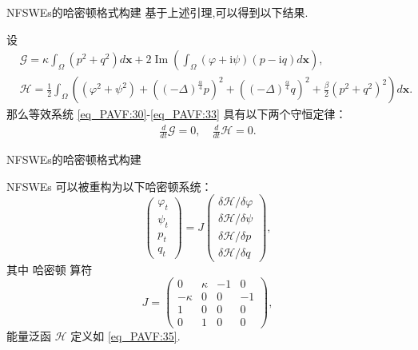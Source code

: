 \documentclass[aspectratio=169]{beamer}
\numberwithin{theorem}{section} %
\begin{document}
\begin{frame}{NFSWEs的哈密顿格式构建}
	基于上述引理,可以得到以下结果.

	\begin{theorem}	\label{thm_PAVF:2_1}
	设
	\begin{align}
	&\mathcal{G}=\kappa\int_{\Omega}(p^2+q^2) d \boldsymbol{x}+2\operatorname{Im}(\int_{\Omega}(\varphi+\mathrm{i}\psi)(p-\mathrm{i}q)d \boldsymbol{x}),\label{eq_PAVF:34} \\
	&\mathcal{H}=\frac{1}{2}\int_{\Omega}\left((\varphi^2+\psi^2)+\left((-\Delta)^{\frac{\alpha}{4}} p\right)^{2}+\left((-\Delta)^{\frac{\alpha}{4}} q\right)^{2}+\frac{\beta}{2}(p^2+q^2)^{2}\right) d \boldsymbol{x}.\label{eq_PAVF:35}
	\end{align}
	那么等效系统 \eqref{eq_PAVF:30}-\eqref{eq_PAVF:33} 具有以下两个守恒定律：
	\begin{align}
	\frac{d}{d t} \mathcal{G}=0, \quad \frac{d}{d t} \mathcal{H}=0.
	\end{align}
	\end{theorem}
\end{frame}


\begin{frame}{NFSWEs的哈密顿格式构建}

	\begin{theorem}\label{thm_PAVF:2}
		NFSWEs 可以被重构为以下哈密顿系统：
	\begin{equation}\label{eq_PAVF:37}
		\left(\begin{array}{l}
			\varphi_{t} \\
			\psi_{t} \\
			p_{t} \\
			q_{t}
			\end{array}\right)=J\left(\begin{array}{l}
			\delta \mathcal{H} / \delta \varphi \\
			\delta \mathcal{H} / \delta \psi \\
			\delta \mathcal{H} / \delta p \\
			\delta \mathcal{H} / \delta q
			\end{array}\right),
	\end{equation}
	其中 哈密顿 算符
	\begin{equation}\label{eq_PAVF:37b}
	J=\left(\begin{array}{cccc}
			0 & \kappa & -1 & 0 \\
			-\kappa & 0 & 0 & -1 \\
			1 & 0 & 0 & 0 \\
			0 & 1 & 0 & 0
			\end{array}\right),
	\end{equation}
	能量泛函 $\mathcal{H}$ 定义如 \eqref{eq_PAVF:35}.
	\end{theorem}
\end{frame}
\end{document}
